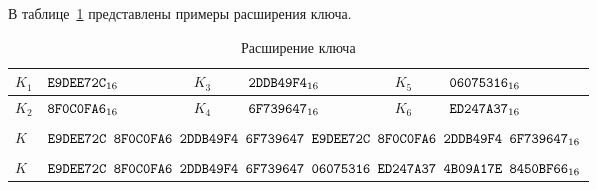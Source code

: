 \label{TEST.KeyExpand}

В таблице~\ref{Table.TEST.KeyExpand}
представлены примеры расширения ключа.

\begin{table}[H]
\caption{Расширение ключа}\label{Table.TEST.KeyExpand}
\begin{tabular}{|l|l|l|l|l|l|}
\hline
$K_1$ & $\texttt{E9DEE72C}_{16}$\hspace{2cm} & 
$K_3$ & $\texttt{2DDB49F4}_{16}$\hspace{2cm} & 
$K_5$ & $\texttt{06075316}_{16}$\\
\hline
$K_2$ & $\texttt{8F0C0FA6}_{16}$ & $K_4$ & $\texttt{6F739647}_{16}$ & $K_6$ & $\texttt{ED247A37}_{16}$\\
\ddhline
\multicolumn{6}{|c|}{$n=4$}\\
\hline
$K$ & \multicolumn{5}{|l|}{
$\texttt{E9DEE72C~8F0C0FA6~2DDB49F4~6F739647~E9DEE72C~8F0C0FA6~2DDB49F4~6F739647}_{16}$
}\\
\ddhline
\multicolumn{6}{|c|}{$n=6$}\\
\hline
$K$ & \multicolumn{5}{|l|}{
$\texttt{E9DEE72C~8F0C0FA6~2DDB49F4~6F739647~06075316~ED247A37~4B09A17E~8450BF66}_{16}$
}\\
\hline
\end{tabular}
\end{table}

